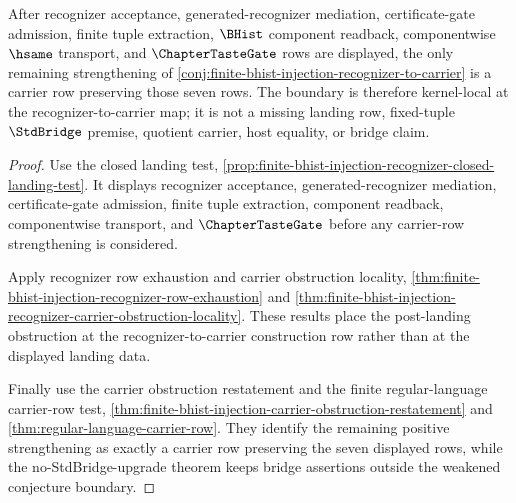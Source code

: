 \begin{theorem}
\label{thm:finite-bhist-injection-carrier-map-row-locality}
After recognizer acceptance, generated-recognizer mediation, certificate-gate admission, finite tuple extraction, $\BHist$ component readback, componentwise $\hsame$ transport, and $\ChapterTasteGate$ rows are displayed, the only remaining strengthening of \autoref{conj:finite-bhist-injection-recognizer-to-carrier} is a carrier row preserving those seven rows. The boundary is therefore kernel-local at the recognizer-to-carrier map; it is not a missing landing row, fixed-tuple $\StdBridge$ premise, quotient carrier, host equality, or bridge claim.
\end{theorem}
\begin{proof}
Use the closed landing test, \autoref{prop:finite-bhist-injection-recognizer-closed-landing-test}. It displays recognizer acceptance, generated-recognizer mediation, certificate-gate admission, finite tuple extraction, component readback, componentwise transport, and $\ChapterTasteGate$ before any carrier-row strengthening is considered.

Apply recognizer row exhaustion and carrier obstruction locality, \autoref{thm:finite-bhist-injection-recognizer-row-exhaustion} and \autoref{thm:finite-bhist-injection-recognizer-carrier-obstruction-locality}. These results place the post-landing obstruction at the recognizer-to-carrier construction row rather than at the displayed landing data.

Finally use the carrier obstruction restatement and the finite regular-language carrier-row test, \autoref{thm:finite-bhist-injection-carrier-obstruction-restatement} and \autoref{thm:regular-language-carrier-row}. They identify the remaining positive strengthening as exactly a carrier row preserving the seven displayed rows, while the no-StdBridge-upgrade theorem keeps bridge assertions outside the weakened conjecture boundary.
\end{proof}

